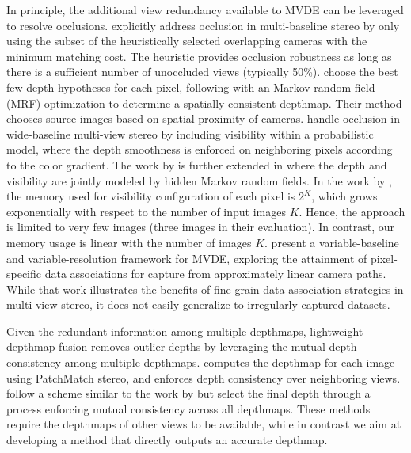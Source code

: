 In principle, the additional view  redundancy available to MVDE can be leveraged to resolve occlusions. \citet{handle_occlusion2001} explicitly address occlusion in multi-baseline stereo by only using the subset of the heuristically selected overlapping cameras with the minimum matching cost. The heuristic provides occlusion robustness as long as there is a sufficient number of unoccluded views (typically 50\%). \citet{MultiHypothesis_ECCV2008} choose the best few depth hypotheses for each pixel, following with an Markov random field (MRF) optimization to determine a spatially consistent depthmap. Their method chooses source images based on spatial proximity of cameras. \citet{Strecha_BayesModelCVPR2004} handle occlusion in wide-baseline multi-view stereo by including visibility within a probabilistic model, where the depth smoothness is enforced on neighboring pixels according to the color gradient. The work by \citet{Strecha_BayesModelCVPR2004} is further extended in \citet{CombinedDepthOutlier} where the depth and visibility are jointly modeled by hidden Markov random fields. In the work by \citet{CombinedDepthOutlier}, the memory used for visibility configuration of each pixel is $2^K$, which grows exponentially with respect to the number of input images $K$. Hence, the approach is limited to very few images (three images in their evaluation). In contrast, our memory usage is linear with the number of images $K$. 
\citet{Gallup08} present a variable-baseline and variable-resolution framework for MVDE, exploring the attainment of pixel-specific data associations for capture from approximately linear camera paths. While that work illustrates the benefits of fine grain data association strategies in multi-view stereo, it does not easily generalize to irregularly captured datasets. 

Given the redundant information among multiple depthmaps, lightweight depthmap fusion removes outlier depths by leveraging the mutual depth consistency among multiple depthmaps.  \citet{Shen_TIP2013} computes the depthmap for each image using PatchMatch \mbox{stereo}, and enforces depth consistency over neighboring views. \citet{LeastCommitment_3DIMPVT2012} follow a scheme similar to the work by \citet{MultiHypothesis_ECCV2008} but select the final depth through a process enforcing mutual consistency across all depthmaps. These methods require the depthmaps of other views to be available, while in contrast we aim at developing a method that directly outputs an accurate depthmap. 

